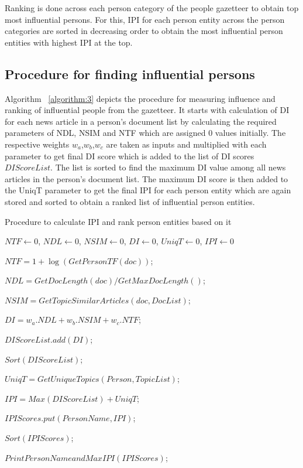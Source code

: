 \documentclass[10pt,journal,compsoc]{IEEEtran}
\begin{document}
Ranking is done across each person category of the people gazetteer to obtain top most influential persons. For this, IPI for each person entity across the person categories are sorted in decreasing order to obtain the most influential person entities with highest IPI at the top.
  
\subsection{Procedure for finding influential persons}

Algorithm ~\ref{algorithm:3} depicts the procedure for measuring influence and ranking of influential people from the gazetteer. It starts with calculation of DI for each news article in a person's document list by calculating the required parameters of NDL, NSIM and NTF which are assigned 0 values initially. The respective weights $w_a$,$w_b$,$w_c$ are taken as inputs and multiplied with each parameter to get final DI score which is added to the list of DI scores $DIScoreList$. The list is sorted to find the maximum DI value among all news articles in the person's document list. The maximum DI score is then added to the UniqT parameter to get the final IPI for each person entity which are again stored and sorted to obtain a ranked list of influential person entities.  



\begin{algorithm}[!htb]
\caption{Procedure to calculate IPI and rank person entities based on it}
\label{algorithm:3}
\begin{algorithmic}
  

 $NTF \leftarrow $0,  $NDL \leftarrow $0, $NSIM \leftarrow $0, $DI\leftarrow $0, $UniqT\leftarrow $0, $IPI\leftarrow $0\;  
  
     {
	{	
		$NTF=1+\log (GetPersonTF(doc))$;
		
$NDL=GetDocLength(doc)/GetMaxDocLength()$;

		$ NSIM=GetTopicSimilarArticles(doc,DocList)$;

		$DI=w_a . NDL+w_b . NSIM+ w_c . NTF$;
		
		$DIScoreList.add(DI)$;
 	 }
		$Sort(DIScoreList)$;

		$UniqT=GetUniqueTopics(Person,TopicList)$;

		$IPI=Max(DIScoreList)+UniqT$;

		$IPIScores.put(PersonName,IPI)$;
       }
	$Sort(IPIScores)$;

	$PrintPersonNameandMaxIPI(IPIScores)$;

\EndFunction
\end{algorithmic}
\end{algorithm}
\end{document}
